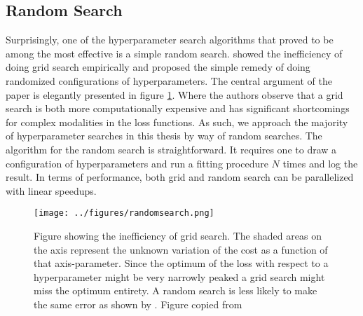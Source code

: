 \subsection{Random Search}
Surprisingly, one of the hyperparameter search algorithms that proved to be among the most effective is a simple random search. \citet{Bergstra2012} showed the inefficiency of doing grid search empirically and proposed the simple remedy of doing randomized configurations of hyperparameters. The central argument of the paper is elegantly presented in figure \ref{fig:randomsearch}. Where the authors observe that a grid search is both more computationally expensive and has significant shortcomings for complex modalities in the loss functions. As such, we approach the majority of hyperparameter searches in this thesis by way of random searches. The algorithm for the random search is straightforward. It requires one to draw a configuration of hyperparameters and run a fitting procedure $N$ times and log the result. In terms of performance, both grid and random search can be parallelized with linear speedups. 

\begin{figure}[H]
\centering
\hspace*{-1.3in}\texttt{[image: ../figures/randomsearch.png]}
\caption[Why randomsearch works]{Figure showing the inefficiency of grid search. The shaded areas on the axis represent the unknown variation of the cost as a function of that axis-parameter. Since the optimum of the loss with respect to a hyperparameter might be very narrowly peaked a grid search might miss the optimum entirety. A random search is less likely to make the same error as shown by \citet{Bergstra2012}. Figure copied from \citet{Bergstra2012}}\label{fig:randomsearch}
\end{figure} 
